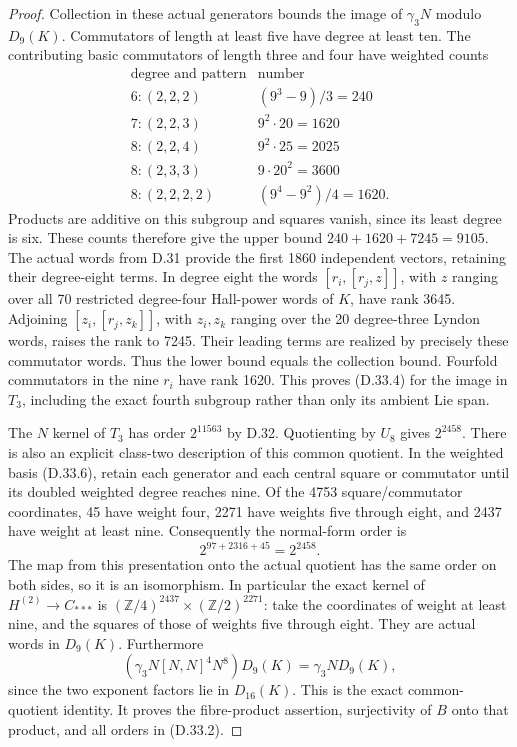 \begin{proof}
Collection in these actual generators bounds the image of $\gamma_3N$
modulo $D_9(K)$. Commutators of length at least five have degree at least
ten. The contributing basic commutators of length three and four have
weighted counts
\[
\begin{array}{c|r}
 \text{degree and pattern}&\text{number}\\\hline
 6:(2,2,2)&(9^3-9)/3=240\\
 7:(2,2,3)&9^2\cdot20=1620\\
 8:(2,2,4)&9^2\cdot25=2025\\
 8:(2,3,3)&9\cdot20^2=3600\\
 8:(2,2,2,2)&(9^4-9^2)/4=1620.
\end{array}                                                     \tag{D.33.7}
\]
Products are additive on this subgroup and squares vanish, since its
least degree is six. These counts therefore give the upper bound
$240+1620+7245=9105$. The actual words from D.31 provide the first
1860 independent vectors, retaining their degree-eight terms. In degree
eight the words $[r_i,[r_j,z]]$, with $z$ ranging over all 70 restricted
degree-four Hall-power words of $K$, have rank 3645. Adjoining
$[z_i,[r_j,z_k]]$, with $z_i,z_k$ ranging over the 20 degree-three
Lyndon words, raises the rank to 7245. Their leading terms are realized
by precisely these commutator words. Thus the lower bound equals the
collection bound. Fourfold commutators in the nine $r_i$ have rank
1620. This proves (D.33.4) for the image in $T_3$, including the exact
fourth subgroup rather than only its ambient Lie span.

The $N$ kernel of $T_3$ has order $2^{11563}$ by D.32. Quotienting by
$U_8$ gives $2^{2458}$. There is also an explicit class-two description
of this common quotient. In the weighted basis (D.33.6), retain each
generator and each central square or commutator until its doubled
weighted degree reaches nine. Of the 4753 square/commutator coordinates,
45 have weight four, 2271 have weights five through eight, and 2437
have weight at least nine. Consequently the normal-form order is
\[
             2^{97+2316+45}=2^{2458}.                  \tag{D.33.8}
\]
The map from this presentation onto the actual quotient has the same
order on both sides, so it is an isomorphism. In particular the exact
kernel of $H^{(2)}\to C_{***}$ is
$(\mathbb Z/4)^{2437}\times(\mathbb Z/2)^{2271}$: take the coordinates
of weight at least nine, and the squares of those of weights five
through eight. They are actual words in $D_9(K)$.
Furthermore
\[
 (\gamma_3N[N,N]^4N^8)D_9(K)=\gamma_3N D_9(K),        \tag{D.33.9}
\]
since the two exponent factors lie in $D_{16}(K)$. This is the exact
common-quotient identity. It proves the fibre-product assertion,
surjectivity of $B$ onto that product, and all orders in (D.33.2).


\end{proof}
